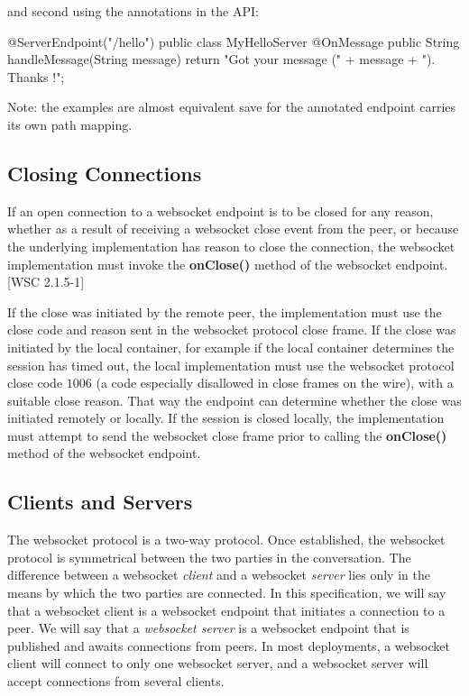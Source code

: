 and second using the annotations in the API:

\begin{listing}{1}
@ServerEndpoint("/hello")
public class MyHelloServer {
    @OnMessage
    public String handleMessage(String message) {
        return "Got your message (" + message + "). Thanks !";
    }
}
\end{listing}

Note: the examples are almost equivalent save for the annotated endpoint carries its own path mapping.

\subsection{Closing Connections}

If an open connection to a websocket endpoint is to be closed for any reason, whether as a result of receiving a websocket close event from the peer, or because the underlying implementation has reason to close the connection, the websocket implementation must invoke the \textbf{onClose()} method of the websocket endpoint. [WSC 2.1.5-1]

If the close was initiated by the remote peer, the implementation must use the close code and reason sent in the websocket protocol close frame. If the close was initiated by the local container, for example if the local container determines the session has timed out, the local implementation must use the websocket protocol close code $1006$ (a code especially disallowed in close frames on the wire), with a suitable close reason. That way the endpoint can determine whether the close was initiated remotely or locally. If the session is closed locally, the implementation must attempt to send the websocket close frame prior to calling the \textbf{onClose()} method of the websocket endpoint.

\subsection{Clients and Servers}

The websocket protocol is a two-way protocol. Once established, the websocket protocol is symmetrical between the two parties in the conversation. The difference between a websocket \emph{client} and a websocket \emph{server} lies only in the means by which the two parties are connected. In this specification, we will say that a websocket client is a websocket endpoint that initiates a connection to a peer. We will say that a \emph{websocket server} is a websocket endpoint that is published and awaits connections from peers. In most deployments, a websocket client will connect to only one websocket server, and a websocket server will accept connections from several clients.


